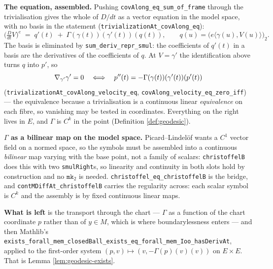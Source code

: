 \begin{lemma}
  \textbf{The equation, assembled.} Pushing
  \texttt{covAlong\_eq\_sum\_of\_frame} through the trivialisation gives the whole of $D/dt$ as
  a vector equation in the model space, with no basis in the statement
  (\texttt{trivializationAt\_covAlong\_eq}):
  \[
    \bigl(\tfrac{D}{dt}V\bigr)^{e} \;=\; q'(t) \;+\; \Gamma(\gamma(t))(\gamma'(t))(q(t)),
    \qquad q(u) = \bigl(e\langle\gamma(u),V(u)\rangle\bigr)_2 .
  \]
  The basis is eliminated by \texttt{sum\_deriv\_repr\_smul}: the coefficients of $q'(t)$ in a
  basis are the derivatives of the coefficients of $q$. At $V = \gamma'$ the identification
  above turns $q$ into $p'$, so
  \[
    \nabla_{\gamma'}\gamma' = 0 \quad\Longleftrightarrow\quad p''(t) = -\Gamma(\gamma(t))(\gamma'(t))(p'(t))
  \]
  (\texttt{trivializationAt\_covAlong\_velocity\_eq},
  \texttt{covAlong\_velocity\_eq\_zero\_iff}) --- the equivalence because a trivialisation is a
  continuous linear \emph{equivalence} on each fibre, so vanishing may be tested in
  coordinates. Everything on the right lives in $E$, and $\Gamma$ is $C^k$ in the point
  (Definition \ref{def:geodesic}).

  \textbf{$\Gamma$ as a bilinear map on the model space.} Picard--Lindel\"of wants a $C^1$
  vector field on a normed space, so the symbols must be assembled into a continuous
  \emph{bilinear} map varying with the base point, not a family of scalars:
  \texttt{christoffelB} does this with two \texttt{smulRight}s, so linearity and continuity in
  both slots hold by construction and no $\texttt{mk}_2$ is needed.
  \texttt{christoffel\_eq\_christoffelB} is the bridge, and
  \texttt{contMDiffAt\_christoffelB} carries the regularity across: each scalar symbol is
  $C^k$ and the assembly is by fixed continuous linear maps.

  \textbf{What is left} is the transport through the chart --- $\Gamma$ as a function of the
  chart coordinate $p$ rather than of $y \in M$, which is where boundarylessness enters --- and
  then Mathlib's
  \texttt{exists\_forall\_mem\_closedBall\_exists\_eq\_forall\_mem\_Ioo\_hasDerivAt}, applied to
  the first-order system $(p,v) \mapsto (v, -\Gamma(p)(v)(v))$ on $E \times E$. That is
  Lemma \ref{lem:geodesic-exists}.
\end{lemma}


